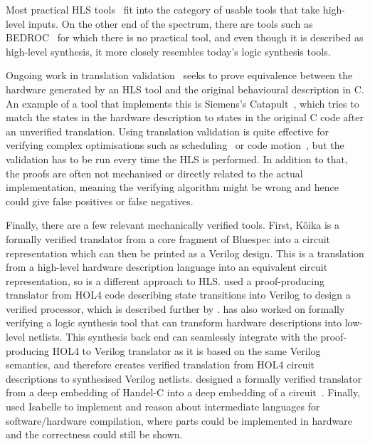 Most practical \gls{HLS} tools~\cite{canis13_l, amd23_vitis_high_synth,
  intel20_sdk_openc_applic, nigam20_predic_accel_desig_time_sensit_affin_types}
fit into the category of usable tools that take high-level inputs.  On the other
end of the spectrum, there are tools such as
BEDROC~\cite{chapman92_verif_bedroc} for which there is no practical tool, and
even though it is described as high-level synthesis, it more closely resembles
today's logic synthesis tools.

Ongoing work in translation validation~\cite{pnueli98_trans} seeks to prove
equivalence between the hardware generated by an HLS tool and the original
behavioural description in C.  An example of a tool that implements this is
Siemens's Catapult~\cite{mentor20_catap_high_level_synth}, which tries to match
the states in the hardware description to states in the original C code after an
unverified translation.  Using translation validation is quite effective for
verifying complex optimisations such as scheduling~\cite{kim04_autom_fsmd,
  karfa06_formal_verif_method_sched_high_synth,
  chouksey20_verif_sched_condit_behav_high_level_synth} or code
motion~\cite{banerjee14_verif_code_motion_techn_using_value_propag,
  chouksey19_trans_valid_code_motion_trans_invol_loops}, but the validation has
to be run every time the HLS is performed.  In addition to that, the proofs are
often not mechanised or directly related to the actual implementation, meaning
the verifying algorithm might be wrong and hence could give false positives or
false negatives.

Finally, there are a few relevant mechanically verified tools.  First, K\^{o}ika
is a formally verified translator from a core fragment of Bluespec into a
circuit representation which can then be printed as a Verilog design.  This is a
translation from a high-level hardware description language into an equivalent
circuit representation, so is a different approach to HLS.
\textcite{lööw19_proof_trans_veril_devel_hol} used a proof-producing translator
from HOL4 code describing state transitions into Verilog to design a verified
processor, which is described further by
\textcite{lööw19_verif_compil_verif_proces}. \textcite{lööw21_lutsig} has also
worked on formally verifying a logic synthesis tool that can transform hardware
descriptions into low-level netlists.  This synthesis back end can seamlessly
integrate with the proof-producing HOL4 to Verilog translator as it is based on
the same Verilog semantics, and therefore creates verified translation from HOL4
circuit descriptions to synthesised Verilog netlists.
 designed a formally
verified translator from a deep embedding of Handel-C into a deep embedding of a
circuit~\cite{perna12_mechan_wire_wise_verif_handel_c_synth,perna11_correc_hardw_synth}.
Finally, \textcite{ellis08_csicgfu} used Isabelle to implement and reason about
intermediate languages for software/hardware compilation, where parts could be
implemented in hardware and the correctness could still be shown.

